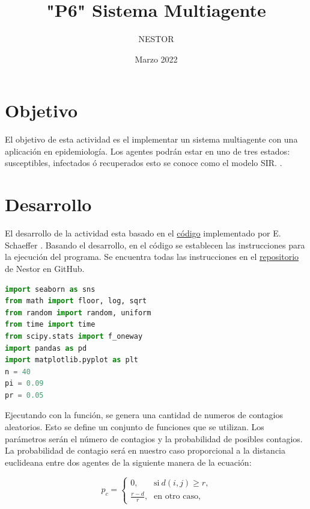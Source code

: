 \documentclass{article}
\title{"P6" Sistema Multiagente}
\author{NESTOR}
\date {Marzo 2022}
\begin{document}
\maketitle

\section{Objetivo}
El objetivo de esta actividad es el implementar un sistema multiagente con una aplicación en epidemiología. Los agentes podrán estar en uno de tres estados: susceptibles, infectados ó recuperados esto se conoce como el modelo SIR. \cite{elisa1}.

\section{Desarrollo}
El desarrollo de la actividad esta basado en el \href{https://https://https://satuelisa.github.io/simulation/p6.html}{c\'odigo} implementado por E. Schaeffer \cite{elisa1}. Basando el desarrollo, en el código \cite{elisa1} se establecen las instrucciones para la ejecución del programa. Se encuentra todas las instrucciones en el  \href{https://https://https://github.com/NestorZeus/SIMULACION-COMPUTACIONAL-DE-NANOMATERIALES/tree/main/P6}{repositorio} de Nestor en GitHub.\\

\begin{lstlisting}[caption=Ejecución de Parámetros, label=codigo1, language=Python]
import seaborn as sns
from math import floor, log, sqrt
from random import random, uniform
from time import time
from scipy.stats import f_oneway
import pandas as pd
import matplotlib.pyplot as plt
n = 40
pi = 0.09
pr = 0.05
\end{lstlisting}

Ejecutando con la función, se genera una cantidad de numeros de contagios aleatorios. Esto se define un conjunto de funciones que se utilizan. Los parámetros serán el número de contagios  y la probabilidad de posibles contagios. La probabilidad de contagio será en nuestro caso proporcional a la distancia euclideana entre dos agentes  de la siguiente manera de la ecuación:

\begin{equation}\label{eq1}
    p_c =
    \begin{cases}
    0\text{,} & \text{si} \ d(i,j) \geq r\text{,}\\
    \frac{r-d}{r}\text{,} & \text{en otro caso,}
    \end{cases}
\end{equation}
\end{document}
